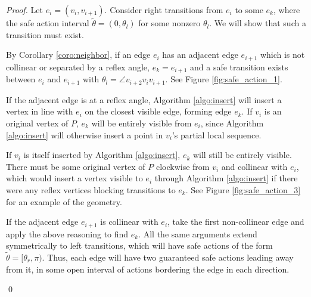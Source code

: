 \documentclass[]{styles/svproc}  %
\begin{document}
\begin{proof}

Let $e_i = (v_i, v_{i+1})$. Consider right transitions from $e_i$ to some $e_k$,
where the safe action interval $\tilde{\theta} = (0, \theta_l)$ for some 
nonzero $\theta_l$. We will show that such a transition must exist. 

By Corollary \ref{coro:neighbor}, if an edge $e_i$ has an adjacent edge
$e_{i+1}$ which is not collinear or separated by a reflex angle, 
$e_k = e_{i+1}$ and a safe transition exists
between $e_i$ and $e_{i+1}$ with $\theta_l = \angle v_{i+2} v_i v_{i+1}$. 
See Figure \ref{fig:safe_action_1}.

If the adjacent edge is at a reflex angle, Algorithm 
\ref{algo:insert} will insert a vertex in line with $e_i$ on the closest visible
edge, forming edge $e_k$. If $v_i$ is an original
vertex of $P$, $e_k$ will be entirely visible from $e_i$, since Algorithm
\ref{algo:insert} will otherwise insert a point in $v_i$'s partial local
sequence.

If $v_i$ is itself inserted by Algorithm \ref{algo:insert}, $e_k$ will still be
entirely visible. There must be some original vertex of $P$
clockwise from $v_i$ and collinear with $e_i$, which would insert a vertex
visible to $e_i$ through Algorithm \ref{algo:insert} if there were any reflex vertices
blocking transitions to $e_k$.
See Figure \ref{fig:safe_action_3} for an example of the geometry.

If the adjacent edge $e_{i+1}$ is collinear with $e_i$, take the first
non-collinear edge and apply the above reasoning to find $e_k$.
All the same arguments extend symmetrically to left transitions, which will have
safe actions of the form $\tilde{\theta} = [\theta_r, \pi)$. Thus, each edge will 
have two guaranteed safe actions leading away from it, in
some open interval of actions bordering the edge in each direction.

\qed
\end{proof}
\end{document}
